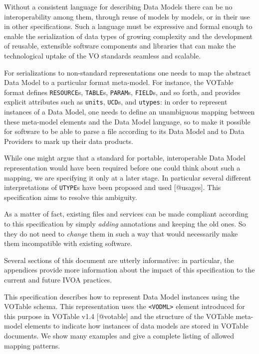 \documentclass[11pt,a4paper]{ivoa}
\begin{document}
Without a consistent language for describing Data Models there can be no
interoperability among them, through reuse of models by models, or in
their use in other specifications. Such a language must be expressive
and formal enough to enable the serialization of data types of growing
complexity and the development of reusable, extensible software
components and libraries that can make the technological uptake of the
VO standards seamless and scalable.

For serializations to non-standard representations one needs to map the
abstract Data Model to a particular format meta-model. For instance, the
VOTable format defines \texttt{RESOURCE}s, \texttt{TABLE}s,
\texttt{PARAM}s, \texttt{FIELD}s, and so forth, and provides explicit
attributes such as \texttt{units}, \texttt{UCD}s, and \texttt{utypes}:
in order to represent instances of a Data Model, one needs to define an
unambiguous mapping between these meta-model elements and the Data Model
language, so to make it possible for software to be able to parse a file
according to its Data Model and to Data Providers to mark up their data
products.

While one might argue that a standard for portable, interoperable Data
Model representation would have been required before one could think
about such a mapping, we are specifying it only at a later stage. In
particular several different interpretations of \texttt{UTYPE}s have
been proposed and used {[}@usages{]}. This specification aims to resolve
this ambiguity.

As a matter of fact, existing files and services can be made compliant
according to this specification by simply \emph{adding} annotations and
keeping the old ones. So they do not need to \emph{change} them in such
a way that would necessarily make them incompatible with existing
software.

Several sections of this document are utterly informative: in
particular, the appendices provide more information about the impact of
this specification to the current and future IVOA practices.

This specification describes how to represent Data Model instances using
the VOTable schema. This representation uses the
\texttt{\textless{}VODML\textgreater{}} element introduced for this
purpose in VOTable v1.4 {[}@votable{]} and the structure of the VOTable
meta-model elements to indicate how instances of data models are stored
in VOTable documents. We show many examples and give a complete listing
of allowed mapping patterns.
\end{document}

